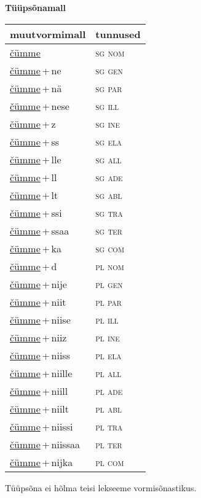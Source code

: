 
\vspace{1.8em}
\begin{minipage}{\textwidth}
\textbf{Tüüpsõnamall \,}\\

\begin{sideways}
\begin{tabular}{l l}
muutvormimall & tunnused \\
\hline
\underline{čümme} & \textsc{ sg nom } \\
\underline{čümme}\,+\,ne & \textsc{ sg gen } \\
\underline{čümme}\,+\,nä & \textsc{ sg par } \\
\underline{čümme}\,+\,nese & \textsc{ sg ill } \\
\underline{čümme}\,+\,z & \textsc{ sg ine } \\
\underline{čümme}\,+\,ss & \textsc{ sg ela } \\
\underline{čümme}\,+\,lle & \textsc{ sg all } \\
\underline{čümme}\,+\,ll & \textsc{ sg ade } \\
\underline{čümme}\,+\,lt & \textsc{ sg abl } \\
\underline{čümme}\,+\,ssi & \textsc{ sg tra } \\
\underline{čümme}\,+\,ssaa & \textsc{ sg ter } \\
\underline{čümme}\,+\,ka & \textsc{ sg com } \\
\underline{čümme}\,+\,d & \textsc{ pl nom } \\
\underline{čümme}\,+\,nije & \textsc{ pl gen } \\
\underline{čümme}\,+\,niit & \textsc{ pl par } \\
\underline{čümme}\,+\,niise & \textsc{ pl ill } \\
\underline{čümme}\,+\,niiz & \textsc{ pl ine } \\
\underline{čümme}\,+\,niiss & \textsc{ pl ela } \\
\underline{čümme}\,+\,niille & \textsc{ pl all } \\
\underline{čümme}\,+\,niill & \textsc{ pl ade } \\
\underline{čümme}\,+\,niilt & \textsc{ pl abl } \\
\underline{čümme}\,+\,niissi & \textsc{ pl tra } \\
\underline{čümme}\,+\,niissaa & \textsc{ pl ter } \\
\underline{čümme}\,+\,nijka & \textsc{ pl com } \\
\end{tabular}
\end{sideways}
\label{tab:tüüpsõnamall-čümme}

\end{minipage}

 
\vspace{1em}
\noindent Tüüpsõna ei hõlma teisi lekseeme vormi\-sõnastikus.
